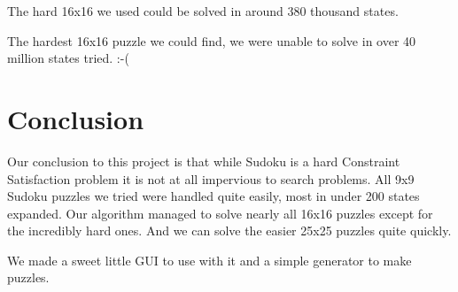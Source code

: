 \documentclass[12pt,a4paper]{article}
\begin{document}
The hard 16x16 we used could be solved in around 380 thousand states.

The hardest 16x16 puzzle we could find, we were unable to solve in over 40 million 
states tried. :-(

\section*{Conclusion}

Our conclusion to this project is that while Sudoku is a hard Constraint
Satisfaction problem it is not at all impervious to search problems. All 9x9
Sudoku puzzles we tried were handled quite easily, most in under 200 states
expanded. Our algorithm managed to solve nearly all 16x16 puzzles except for
the incredibly hard ones. And we can solve the easier 25x25 puzzles quite
quickly.

We made a sweet little GUI to use with it and a simple generator to make
puzzles.
\end{document}
